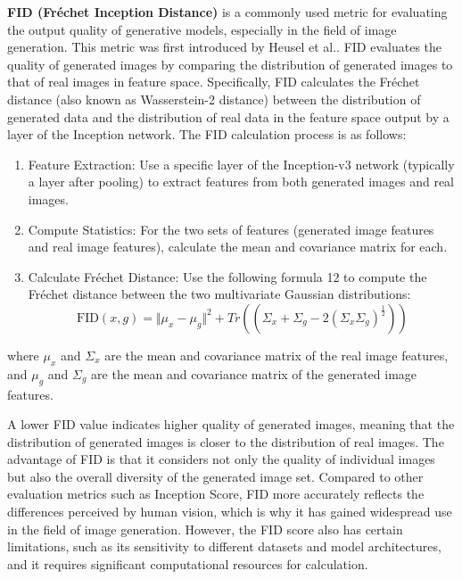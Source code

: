 \textbf{FID (Fréchet Inception Distance)} is a commonly used metric for evaluating the output quality of generative models, especially in the field of image generation. This metric was first introduced by Heusel et al.\citep{74heusel2017gans}. FID evaluates the quality of generated images by comparing the distribution of generated images to that of real images in feature space. Specifically, FID calculates the Fréchet distance (also known as Wasserstein-2 distance) between the distribution of generated data and the distribution of real data in the feature space output by a layer of the Inception network. The FID calculation process is as follows:
\begin{enumerate}
    \item  Feature Extraction: Use a specific layer of the Inception-v3 network (typically a layer after pooling) to extract features from both generated images and real images.
    \item Compute Statistics: For the two sets of features (generated image features and real image features), calculate the mean and covariance matrix for each.
    \item Calculate Fréchet Distance: Use the following formula 12 to compute the Fréchet distance between the two multivariate Gaussian distributions:
    \begin{equation}
        \label{FID_equation}
        \text{FID}(x, g) = \Vert\mu_x - \mu_g\Vert^2 + Tr\left((\Sigma_x + \Sigma_g - 2(\Sigma_x\Sigma_g)^{\frac{1}{2}})\right)
    \end{equation}
\end{enumerate}
where $ \mu_x$ and $\Sigma_x $ are the mean and covariance matrix of the real image features, and $\mu_g$ and $\Sigma_g$ are the mean and covariance matrix of the generated image features.

A lower FID value indicates higher quality of generated images, meaning that the distribution of generated images is closer to the distribution of real images. The advantage of FID is that it considers not only the quality of individual images but also the overall diversity of the generated image set. Compared to other evaluation metrics such as Inception Score, FID more accurately reflects the differences perceived by human vision, which is why it has gained widespread use in the field of image generation. However, the FID score also has certain limitations, such as its sensitivity to different datasets and model architectures, and it requires significant computational resources for calculation.


